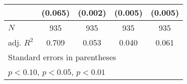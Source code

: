 {\begin{tabular}{l*{4}{c}}
            &     (0.065)         &     (0.002)         &     (0.005)         &     (0.005)         \\
\hline
\(N\)       &         935         &         935         &         935         &         935         \\
adj. \(R^{2}\)&       0.709         &       0.053         &       0.040         &       0.061         \\
\hline\hline
\multicolumn{5}{l}{\footnotesize Standard errors in parentheses}\\
\multicolumn{5}{l}{\footnotesize \sym{*} \(p<0.10\), \sym{**} \(p<0.05\), \sym{***} \(p<0.01\)}\\
\end{tabular}
}
